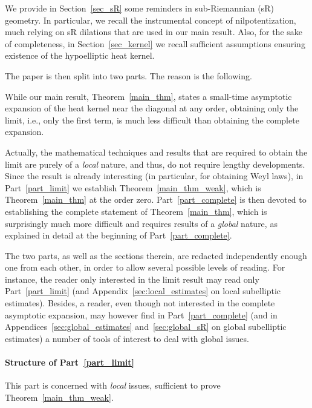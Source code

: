 \documentclass[AHL,Unicode,published]{cedram}
\begin{document}

We provide in Section~\ref{sec_sR} some reminders in sub-Riemannian (sR) geometry. In particular, we recall the instrumental concept of nilpotentization, much relying on sR dilations that are used in our main result. Also, for the sake of completeness, in Section~\ref{sec_kernel} we recall sufficient assumptions ensuring existence of the hypoelliptic heat kernel.


The paper is then split into two parts. The reason is the following.

While our main result, Theorem~\ref{main_thm}, states a small-time asymptotic expansion of the heat kernel near the diagonal at any order, obtaining only the limit, i.e., only the first term, is much less difficult than obtaining the complete expansion.

Actually, the mathematical techniques and results that are required to obtain the limit are purely of a \emph{local} nature, and thus, do not require lengthy developments. Since the result is already interesting (in particular, for obtaining Weyl laws), in Part~\ref{part_limit} we establish Theorem~\ref{main_thm_weak}, which is Theorem~\ref{main_thm} at the order zero. Part~\ref{part_complete} is then devoted to establishing the complete statement of Theorem~\ref{main_thm}, which is surprisingly much more difficult and requires results of a \emph{global} nature, as explained in detail at the beginning of Part~\ref{part_complete}.

The two parts, as well as the sections therein, are redacted independently enough one from each other, in order to allow several possible levels of reading. For instance, the reader only interested in the limit result may read only Part~\ref{part_limit} (and Appendix~\ref{sec:local_estimates} on local subelliptic estimates). Besides, a reader, even though not interested in the complete asymptotic expansion, may however find in Part~\ref{part_complete} (and in Appendices~\ref{sec:global_estimates} and~\ref{sec:global_sR} on global subelliptic estimates) a number of tools of interest to deal with global issues.


\goodbreak
\paragraph{Structure of Part~\ref{part_limit}}
This part is concerned with \emph{local} issues, sufficient to prove Theorem~\ref{main_thm_weak}.
\end{document}
